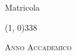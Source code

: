 \begin{titlepage}
\begin{center}
\begin{normalsize}
            \begin{flushright}
                \textit{\graduateTitle}\\
                \myName\\
                Matricola \myStudentID
            \end{flushright}
        \end{normalsize}

        \vspace*{\fill}
        
        \line(1, 0){338} \\
        \begin{normalsize}
            \textsc{Anno Accademico \myAA}
        \end{normalsize}
    \end{center}
\end{titlepage}
